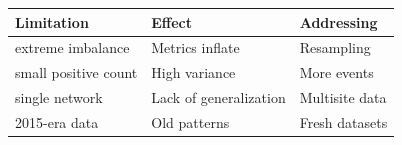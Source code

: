 \begin{tabular}{lll}
\toprule
Limitation & Effect & Addressing \\
\midrule
extreme imbalance & Metrics inflate & Resampling \\
small positive count & High variance & More events \\
single network & Lack of generalization & Multisite data \\
2015-era data & Old patterns & Fresh datasets \\
\bottomrule
\end{tabular}
